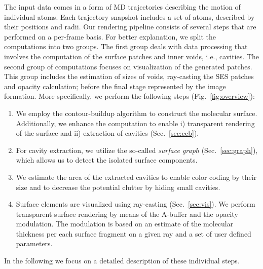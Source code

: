 The input data comes in a form of MD trajectories describing the motion of individual atoms. 
Each trajectory snapshot includes a set of atoms, described by their positions and radii. 
Our rendering pipeline consists of several steps that are performed on a per-frame basis. 
For better explanation, we split the computations into two groups. 
The first group deals with data processing that involves the computation of the surface patches and inner voids, i.e., cavities.
The second group of computations focuses on visualization of the generated patches. 
This group includes the estimation of sizes of voids, ray-casting the SES patches and opacity calculation; before the final stage represented by the image formation. More specifically, we perform the following steps (Fig.~\ref{fig:overview}):
	\begin{enumerate}
	  \item We employ the contour-buildup algorithm to construct the molecular surface. Additionally, we enhance the computation to enable i) transparent rendering of the surface and ii) extraction of cavities (Sec.~\ref{sec:ecb}).
		\item For cavity extraction, we utilize the so-called \textit{surface graph} (Sec.~\ref{sec:graph}), which allows us to detect the isolated surface components.
		\item We estimate the area of the extracted cavities to enable color coding by their size and to decrease the potential clutter by hiding small cavities.
		\item Surface elements are visualized using ray-casting (Sec.~\ref{sec:vis}). We perform transparent surface rendering by means of the A-buffer and the opacity modulation. The modulation is based on an estimate of the molecular thickness per each surface fragment on a given ray and a set of user defined parameters.
	\end{enumerate}
	
In the following we focus on a detailed description of these individual steps.